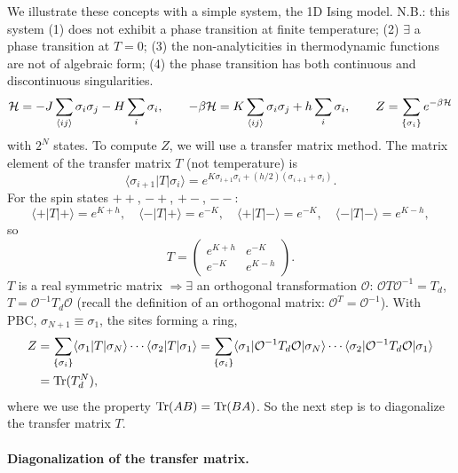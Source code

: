 We illustrate these concepts with a simple system, the 1D Ising model. N.B.: this system
(1) does not exhibit a phase transition at finite temperature; (2) $\exists$ a phase
transition at $T = 0$; (3) the non-analyticities in thermodynamic functions are not of
algebraic form; (4) the phase transition has both continuous and discontinuous
singularities.
\begin{equation}
  \mathcal{H} = -J\sum_{\langle ij\rangle}\sigma_i\sigma_j - H\sum_i\sigma_i,\qquad
  -\beta\mathcal{H} = K\sum_{\langle ij\rangle}\sigma_i\sigma_j + h\sum_i\sigma_i,\qquad
  Z = \sum_{\{\sigma_i\}}e^{-\beta\mathcal{H}}
\end{equation}
with $2^N$ states. To compute $Z$, we will use a transfer matrix method. The matrix element
of the transfer matrix $T$ (not temperature) is
\begin{equation}
  \langle\sigma_{i+1}|T|\sigma_i\rangle = e^{K\sigma_{i+1}\sigma_i + (h/2)(\sigma_{i+1}+\sigma_i)}.
\end{equation}
For the spin states $++$, $-+$, $+-$, $--$:
\begin{equation}
  \langle +|T|+\rangle = e^{K+h},\quad
  \langle -|T|+\rangle = e^{-K},\quad
  \langle +|T|-\rangle = e^{-K},\quad
  \langle -|T|-\rangle = e^{K-h},
\end{equation}
so
\begin{equation}
  T = \begin{pmatrix} e^{K+h} & e^{-K}\\ e^{-K} & e^{K-h}\end{pmatrix}.
\end{equation}
$T$ is a real symmetric matrix $\Rightarrow\exists$ an orthogonal transformation
$\mathcal{O}$: $\mathcal{O}T\mathcal{O}^{-1} = T_d$, $T = \mathcal{O}^{-1}T_d\mathcal{O}$
(recall the definition of an orthogonal matrix: $\mathcal{O}^T = \mathcal{O}^{-1}$). With
PBC, $\sigma_{N+1}\equiv\sigma_1$, the sites forming a ring,
\begin{align}
  Z &= \sum_{\{\sigma_i\}}\langle\sigma_1|T|\sigma_N\rangle\cdots\langle\sigma_2|T|\sigma_1\rangle
     = \sum_{\{\sigma_i\}}\langle\sigma_1|\mathcal{O}^{-1}T_d\mathcal{O}|\sigma_N\rangle\cdots
       \langle\sigma_2|\mathcal{O}^{-1}T_d\mathcal{O}|\sigma_1\rangle\nonumber\\
    &= \operatorname{Tr}(T_d^N),
\end{align}
where we use the property $\operatorname{Tr}(AB) = \operatorname{Tr}(BA)$. So the next step is to diagonalize the
transfer matrix $T$.

\paragraph{Diagonalization of the transfer matrix.}

